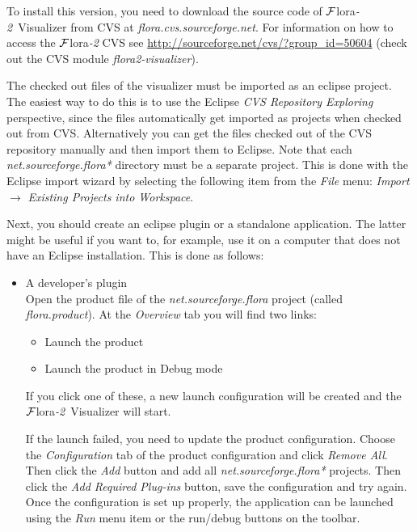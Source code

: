 \documentclass[a4paper,11pt]{article}
\newcommand{\FLORA}{{\mbox{\sc ${\cal F}${lora}\rm\emph{-2}}}\xspace}
\newcommand{\FVIZ}{{\mbox{\sc ${\cal F}${lora}\rm\emph{-2} {Visualizer}}}\xspace}
\begin{document}
\begin{enumerate}
  To install this version, you need to download the source
  code of \FVIZ from CVS at \emph{flora.cvs.sourceforge.net}.
  For information on how to access the \FLORA CVS see
  \url{http://sourceforge.net/cvs/?group_id=50604}
  (check out the CVS module {\em flora2-visualizer}).

  The checked out files of the visualizer must be imported as an eclipse
  project.  The easiest way to do this is to use the Eclipse \emph{CVS
    Repository Exploring} perspective, since the files automatically get
  imported as projects when checked out from CVS.  Alternatively you can
  get the files checked out of the CVS repository manually and then import
  them to Eclipse.  Note that each \emph{net.sourceforge.flora*} directory
  must be a separate project. This is done with the Eclipse import wizard
  by selecting the following item from the \emph{File} menu:
  \emph{Import} $\rightarrow$ \emph{Existing Projects into Workspace}.

  Next, you should create an eclipse plugin or a standalone
  application. The latter might be useful if you want to, for example, use
  it on a computer that does not have an Eclipse installation.
  This is done as follows:
\begin{itemize}
\item A developer's plugin\\
  Open the product file of the
  \emph{net.sourceforge.flora} project (called \emph{flora.product}).
  At the \emph{Overview} tab you will find two links:
  \begin{itemize}
  \item Launch the product
  \item Launch the product in Debug mode
  \end{itemize}
  If you click one of these, a new launch configuration will be created and
  the \FVIZ will start.

  If the launch failed, you need to update the product
  configuration. Choose the \emph{Configuration} tab of the product
  configuration and click \emph{Remove All}. Then click the \emph{Add}
  button and add all \emph{net.sourceforge.flora*} projects. Then click the
  \emph{Add Required Plug-ins} button, save the configuration and try
  again.  Once the configuration is set up properly, the application can be
  launched using the \emph{Run} menu item or the run/debug buttons on the
  toolbar.
  

\end{itemize}
\end{enumerate}
\end{document}
